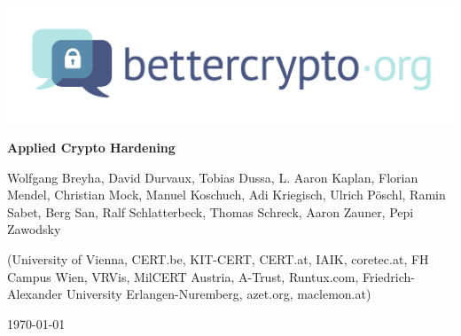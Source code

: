 \begin{titlepage}
  \begin{center}
    \includegraphics[scale=0.5]{img/logo}
    \vspace{45pt}
    \HorRule
    \bigskip
    {\fontsize{35}{36} \bfseries Applied Crypto Hardening\par}
    \bigskip
  \end{center}
  \begin{flushleft}
    {\large \color{intersectgreen} Wolfgang Breyha, David Durvaux, Tobias
      Dussa, L. Aaron Kaplan, Florian Mendel, Christian Mock, Manuel Koschuch,
      Adi Kriegisch, Ulrich P\"oschl, Ramin Sabet, Berg San, Ralf
      Schlatterbeck, Thomas Schreck, Aaron Zauner, Pepi Zawodsky
      \par}
    \bigskip
    (University of Vienna, CERT.be, KIT-CERT, CERT.at, IAIK, coretec.at, FH
    Campus Wien, VRVis, MilCERT Austria, A-Trust, Runtux.com,
    Friedrich-Alexander University Erlangen-Nuremberg, azet.org, maclemon.at)
  \end{flushleft}
  \HorRule
  \begin{center}
    \today
  \end{center}
\end{titlepage}
